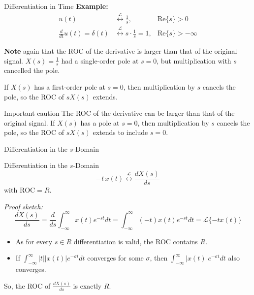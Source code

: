 \begin{frame}[t]{Differentiation in Time}
  \small
  \textbf{Example:}
  \begin{align*}
    u(t) & \stackrel{\mathcal{L}}{\longleftrightarrow} \frac{1}{s}, & \text{Re}\{s\}>0 \\
    \frac{d}{dt}u(t)  = \delta(t) & \stackrel{\mathcal{L}}{\longleftrightarrow} s \cdot \frac{1}{s} = 1, & \text{Re}\{s\}>-\infty
  \end{align*}
  \vspace{0.25cm}

  \noindent
  \textbf{Note} again that the ROC of the derivative is larger than that of the original signal.
  $X(s) = \frac{1}{s}$ had a single-order pole at $s=0$, but multiplication with $s$ cancelled the pole.
  \vspace{0.25cm}

  If $X(s)$ has a first-order pole at $s=0$, then multiplication by $s$ cancels the pole, so the ROC of $sX(s)$ extends.

  \begin{insightbox}{Important caution}
    The ROC of the derivative can be larger than that of the original signal.
    If $X(s)$ has a pole at $s=0$, then multiplication by $s$ cancels the pole, so the ROC of $sX(s)$ extends to include $s=0$.
  \end{insightbox}
\end{frame}

\begin{frame}[t]{Differentiation in the \texorpdfstring{$s$}{s}-Domain}
  \small
  \begin{conceptbox}{Differentiation in the $s$-Domain}
    \[
      -t\,x(t)
      \stackrel{\mathcal{L}}{\longleftrightarrow}
      \frac{dX(s)}{ds}
    \]
    with $\text{ROC}=R$.
  \end{conceptbox}
  \vspace{0.5cm}

  \textit{Proof sketch:}
  \[
    \frac{dX(s)}{ds}
    =
    \frac{d}{ds}\int_{-\infty}^{\infty} x(t)e^{-st}dt
    =
    \int_{-\infty}^{\infty} (-t)x(t)e^{-st}dt
    = \mathcal{L}\{-t x(t)\}
  \]
  \begin{itemize}
    \item As for every $s \in R$ differentiation is valid, the ROC contains $R$.
    \item If $\int_{-\infty}^{\infty} |t||x(t)| e^{-\sigma t} dt$ converges for some $\sigma$, then $\int_{-\infty}^{\infty} |x(t)| e^{-\sigma t} dt$ also converges.
  \end{itemize}
  So, the ROC of $\frac{dX(s)}{ds}$ is exactly $R$.

\end{frame}

